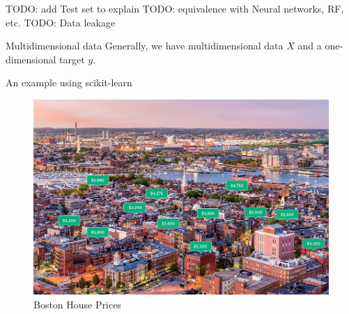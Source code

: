 \documentclass[handout]{beamer}
\begin{document}
TODO: add Test set to explain
TODO: equivalence with Neural networks, RF, etc.
TODO: Data leakage

\begin{frame}{Multidimensional data}
Generally, we have multidimensional data $X$ and a one-dimensional target $y$.
\begin{figure}
 \end{figure}
\end{frame}
\begin{frame}{An example using scikit-learn}
    \begin{figure}
    \caption*{Boston House Prices}
    \includegraphics[width=.9\textwidth]{fig/L1/boston-rent.jpg}
    \end{figure}
\end{frame}



\end{document}
